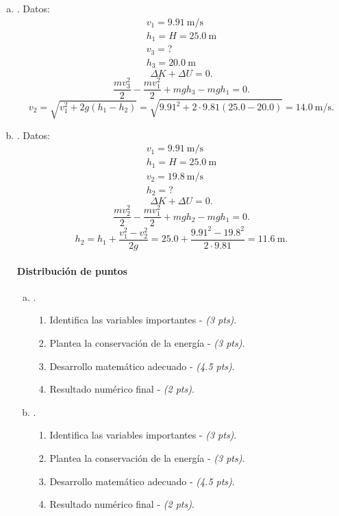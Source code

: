 \documentclass[
  12pt,
]{article}
\newcommand{\pts}[1]{ {\it (#1 pts)}}
\newcommand{\unit}[1]{\:\mathrm{#1}}
\begin{document}
\begin{enumerate}[a)]
  \item .
  Datos:
  \[\begin{array}{l}
    v_1 = 9.91\unit{m/s}\\
    h_1 = H = 25.0 \unit{m}\\
    v_3 = ? \\
    h_3 = 20.0 \unit{m}
  \end{array}\]
\[
 \Delta K + \Delta U = 0
.\] 
\[
  \frac{mv_3^2}{2} - \frac{mv_1^2}{2} + mgh_3 - mgh_1 = 0
.\] 
\[
  v_2 = \sqrt{v_1^2 + 2g\left( h_1 - h_2 \right) }
  = \sqrt{9.91^2 + 2 \cdot 9.81 (25.0 - 20.0)} = 14.0\unit{m/s}
.\] 
  \item .
  Datos:
  \[\begin{array}{l}
    v_1 = 9.91\unit{m/s}\\
    h_1 = H = 25.0 \unit{m}\\
    v_2 = 19.8\unit{m/s} \\
    h_2 = ?
  \end{array}\]
\[
 \Delta K + \Delta U = 0
.\] 
\[
  \frac{mv_2^2}{2} - \frac{mv_1^2}{2} + mgh_2 - mgh_1 = 0
.\] 
\[
  h_2 = h_1 + \frac{v_1^2 - v_2^2}{2g}
  = 25.0 + \frac{9.91^2 - 19.8^2}{2\cdot 9.81} = 11.6\unit{m}
.\] 

  \paragraph{Distribución de puntos}
  \renewcommand{\labelenumiv}{\theenumi\theenumiii-\arabic{enumiv})}
  \begin{enumerate}[a)]
      \item .
    \begin{enumerate}
      \item Identifica las variables importantes - \pts{3}.
      \item Plantea la conservación de la energía - \pts{3}.
      \item Desarrollo matemático adecuado - \pts{4.5}.
      \item Resultado numérico final - \pts{2}.
    \end{enumerate}
      \item .
    \begin{enumerate}
      \item Identifica las variables importantes - \pts{3}.
      \item Plantea la conservación de la energía - \pts{3}.
      \item Desarrollo matemático adecuado - \pts{4.5}.
      \item Resultado numérico final - \pts{2}.
    \end{enumerate}
  \end{enumerate}
\end{enumerate}
\end{document}
